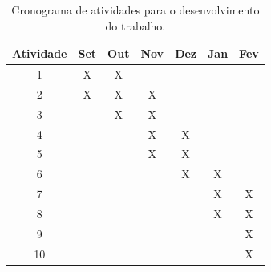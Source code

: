 \begin{table}[H]
\centering
\caption{Cronograma de atividades para o desenvolvimento do trabalho.}
\label{tab:cronograma}
\begin{tabular}{|c|c|c|c|c|c|c|}
\hline
\textbf{Atividade} & \textbf{Set} & \textbf{Out} & \textbf{Nov} & \textbf{Dez} & \textbf{Jan} & \textbf{Fev} \\
\hline
1 & X & X &   &   &   &   \\
\hline
2 & X & X & X &   &   &   \\
\hline
3 &   & X  & X &  &   &   \\
\hline
4 &   &   & X & X &   &   \\
\hline
5 &   &   & X  & X &  &   \\
\hline
6 &   &   &   & X & X &  \\
\hline
7 &   &   &   &  & X & X \\
\hline
8 &   &   &   &   & X & X \\
\hline
9 &   &   &   &   &   & X \\
\hline
10&   &   &   &   &   & X \\
\hline
\end{tabular}
\end{table}